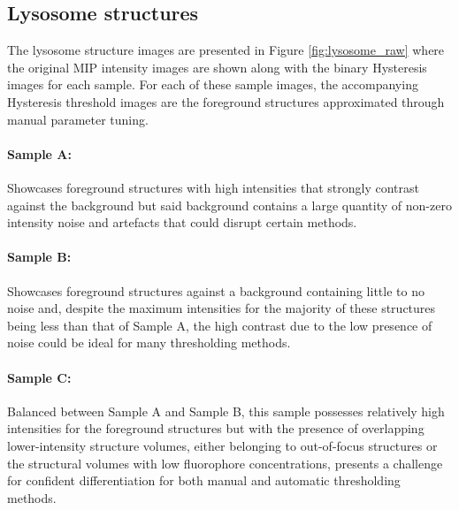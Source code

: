 \subsection{Lysosome structures}
The lysosome structure images are presented in Figure \ref{fig:lysosome_raw} where the original MIP intensity images are shown along with the binary Hysteresis images for each sample. For each of these sample images, the accompanying Hysteresis threshold images are the foreground structures approximated through manual parameter tuning. \paragraph{Sample A:} Showcases foreground structures with high intensities that strongly contrast against the background but said background contains a large quantity of non-zero intensity noise and artefacts that could disrupt certain methods. \paragraph{Sample B:} Showcases foreground structures against a background containing little to no noise and, despite the maximum intensities for the majority of these structures being less than that of Sample A, the high contrast due to the low presence of noise could be ideal for many thresholding methods.\paragraph{Sample C:} Balanced between Sample A and Sample B, this sample possesses relatively high intensities for the foreground structures but with the presence of overlapping lower-intensity structure volumes, either belonging to out-of-focus structures or the structural volumes with low fluorophore concentrations, presents a challenge for confident differentiation for both manual and automatic thresholding methods.


